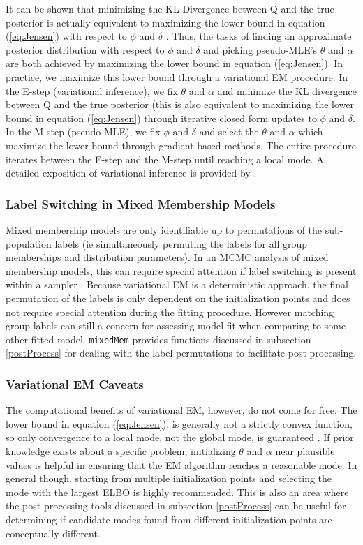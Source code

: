 \documentclass{article}
\begin{document}
It can be shown that minimizing the KL Divergence between Q and the true posterior is actually equivalent to maximizing the lower bound in equation (\ref{eq:Jensen}) with respect to $\phi$ and $\delta$ \citep{beal2003variational}. Thus, the tasks of finding an approximate posterior distribution with respect to $\phi$ and $\delta$ and picking pseudo-MLE's $\theta$ and $\alpha$ are both achieved by maximizing the lower bound in equation (\ref{eq:Jensen}). In practice, we maximize this lower bound through a variational EM procedure. In the E-step (variational inference), we fix $\theta$ and $\alpha$ and minimize the KL divergence between Q and the true posterior   (this is also equivalent to maximizing the lower bound in equation (\ref{eq:Jensen}) through iterative closed form updates to $\phi$ and $\delta$. In the M-step (pseudo-MLE), we fix $\phi$ and $\delta$ and select the $\theta$ and $\alpha$ which maximize the lower bound through gradient based methods. The entire procedure iterates between the E-step and the M-step until reaching a local mode. A detailed exposition of variational inference is provided by \cite{jaakkola200110}.

\subsubsection{Label Switching in Mixed Membership Models}
Mixed membership models are only identifiable up to permutations of the sub-population labels (ie simultaneously permuting the labels for all group memberships and distribution parameters). In an MCMC analysis of mixed membership models, this can require special attention if label switching is present within a sampler \citep{stephens2000dealing}. Because variational EM is a deterministic approach, the final permutation of the labels is only dependent on the initialization points and does not require special attention during the fitting procedure. However matching group labels can still a concern for assessing model fit when comparing to some other fitted model. \texttt{mixedMem} provides functions discussed in subsection \ref{postProcess}  for dealing with the label permutations to facilitate post-processing.   

\subsubsection{Variational EM Caveats}
The computational benefits of variational EM, however, do not come for free. The lower bound in equation (\ref{eq:Jensen}), is generally not a strictly convex function, so only convergence to a local mode, not the global mode, is guaranteed \citep{wainwright2008graphical}. If prior knowledge exists about a specific problem, initializing $\theta$ and $\alpha$ near plausible values is helpful in ensuring that the EM algorithm reaches a reasonable mode. In general though, starting from multiple initialization points and selecting the mode with the largest ELBO is highly recommended. This is also an area where the post-processing tools discussed in subsection \ref{postProcess} can be useful for determining if candidate modes found from different initialization points are conceptually different.
\end{document}
